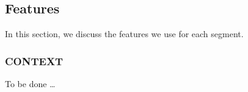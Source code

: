 \subsection{Features}

In this section, we discuss the features we use for each segment.

\subsubsection{CONTEXT}

To be done \ldots
